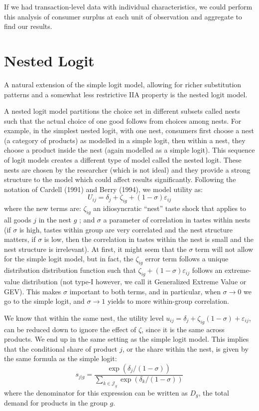 If we had transaction-level data with individual characteristics, we could perform this analysis of consumer surplus at each unit of observation and aggregate to find our results.

\section{Nested Logit}

A natural extension of the simple logit model, allowing for richer substitution patterns and a somewhat less restrictive IIA property is the nested logit model.

A nested logit model partitions the choice set in different subsets called nests such that the actual choice of one good follows from choices among nests. For example, in the simplest nested logit, with one nest, consumers first choose a nest (a category of products) as modelled in a simple logit, then within a nest, they choose a product inside the nest (again modelled as a simple logit). This sequence of logit models creates a different type of model called the nested logit. These nests are chosen by the researcher (which is not ideal) and they provide a strong structure to the model which could affect results significantly. Following the notation of Cardell (1991) and Berry (1994), we model utility as: $$U_{ij} = \delta_j + \zeta_{ig} + (1 - \sigma)\varepsilon_{ij} $$ where the new terms are: $\zeta_{ig}$ an idiosyncratic ``nest'' taste shock that applies to all goods $j$ in the nest $g$ ; and $\sigma$ a parameter of correlation in tastes within nests (if $\sigma$ is high, tastes within group are very correlated and the nest structure matters, if $\sigma$ is low, then the correlation in tastes within the nest is small and the nest structure is irrelevant). At first, it might seem that the $\sigma$ term will not allow for the simple logit model, but in fact, the $\zeta_{ig}$ error term follows a unique distribution distribution function such that $\zeta_{ig} + (1 - \sigma)\varepsilon_{ij}$ follows an extreme-value distribution (not type-I however, we call it Generalized Extreme Value or GEV). This makes $\sigma$ important to both terms, and in particular, when $\sigma \to 0$ we go to the simple logit, and $\sigma\to 1$ yields to more within-group correlation.

We know that within the same nest, the utility level  $u_{ij} = \delta_j + \zeta_{ig} (1 - \sigma) + \varepsilon_{ij}$, can be reduced down to ignore the effect of $\zeta$, since it is the same across products. We end up in the same setting as the simple logit model. This implies that the conditional share of product $j$, or the share within the nest, is given by the same formula as the simple logit: $$s_{j\vert g} = \frac{\exp(\delta_j/(1-\sigma))}{\sum_{k\in\mathcal{J}_g} \exp(\delta_k/(1-\sigma))} $$ where the denominator for this expression can be written as $D_g$, the total demand for products in the group $g$.

